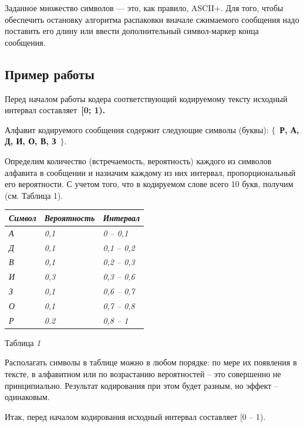 \documentclass[12pt]{article}
\begin{document}
Заданное множество символов --- это, как правило, ASCII+. Для того, чтобы обеспечить остановку алгоритма распаковки вначале сжимаемого сообщения надо поставить его длину или ввести дополнительный символ-маркер конца сообщения.

\newpage 

\begin{center}
    \section*{Пример работы}
\end{center}

Перед началом работы кодера соответствующий кодируемому тексту исходный интервал составляет~\textbf{[0; 1).}

Алфавит кодируемого сообщения содержит следующие символы (буквы): $\mathrm{\{}$~\textbf{Р, А, Д, И, О, В, З}~$\mathrm{\}}$.

Определим количество (встречаемость, вероятность) каждого из символов алфавита в сообщении и назначим каждому из них интервал, пропорциональный его вероятности. С учетом того, что в кодируемом слове всего 10 букв, получим (см. Таблица 1).

\begin{tabular}{|p{1.5in}|p{0.9in}|p{0.6in}|} \hline 
\textit{Символ} & \textit{Вероятность} & \textit{Интервал} \\ \hline 
\textit{А} & \textit{0,1} & \textit{0 -- 0,1} \\ \hline 
\textit{Д} & \textit{0,1} & \textit{0,1 -- 0,2} \\ \hline 
\textit{В} & \textit{0,1} & \textit{0,2 -- 0,3} \\ \hline 
\textit{И} & \textit{0,3} & \textit{0,3 -- 0,6} \\ \hline 
\textit{З} & \textit{0,1} & \textit{0,6 -- 0,7} \\ \hline 
\textit{О} & \textit{0,1} & \textit{0,7 -- 0,8} \\ \hline 
\textit{Р} & \textit{0.2} & \textit{0,8 -- 1} \\ \hline 
\end{tabular}

Таблица \textit{1}

Располагать символы в таблице можно в любом порядке: по мере их появления в тексте, в алфавитном или по возрастанию вероятностей -- это совершенно не принципиально. Результат кодирования при этом будет разным, но эффект -- одинаковым.

Итак, перед началом кодирования исходный интервал составляет [0 -- 1).
\end{document}
